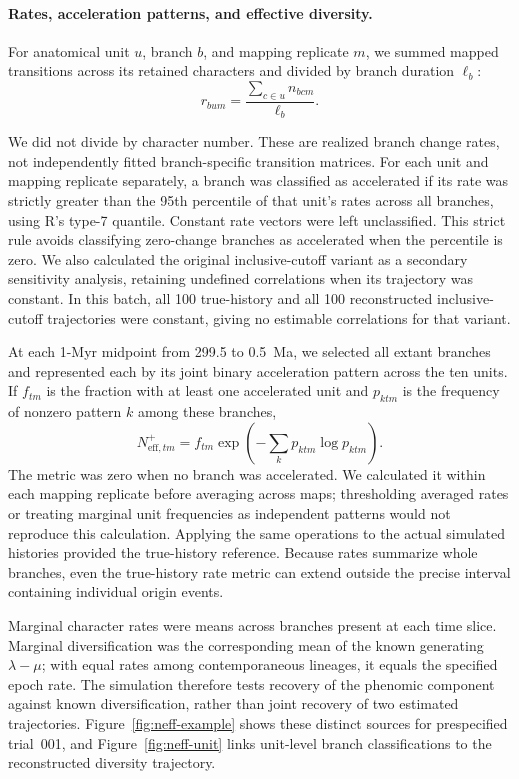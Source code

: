 \begin{samepage}
\paragraph{Rates, acceleration patterns, and effective diversity.}
For anatomical unit $u$, branch $b$, and mapping replicate $m$, we summed
mapped transitions across its retained characters and divided by branch
duration $\ell_b$:
\[
  r_{bum}=\frac{\sum_{c\in u}n_{bcm}}{\ell_b}.
\]
\end{samepage}
We did not divide by character number. These are realized branch change
rates, not independently fitted branch-specific transition matrices.
For each unit and mapping replicate separately, a branch was classified as
accelerated if its rate was strictly greater than the 95th percentile of
that unit's rates across all branches, using R's type-7 quantile.
Constant rate vectors were left unclassified. This strict rule avoids
classifying zero-change branches as accelerated when the percentile is zero.
We also calculated the original inclusive-cutoff variant as a secondary
sensitivity analysis, retaining undefined correlations when its trajectory
was constant. In this batch, all 100 true-history and all 100 reconstructed
inclusive-cutoff trajectories were constant, giving no estimable
correlations for that variant.

At each 1-Myr midpoint from 299.5 to 0.5~Ma, we selected all extant branches
and represented each by its joint binary acceleration pattern across the
ten units. If $f_{tm}$ is the fraction with at least one accelerated unit and
$p_{ktm}$ is the frequency of nonzero pattern $k$ among these branches,
\[
  N_{\mathrm{eff},tm}^{+}
  = f_{tm}\exp\left(-\sum_k p_{ktm}\log p_{ktm}\right).
\]
The metric was zero when no branch was accelerated. We calculated it within
each mapping replicate before averaging across maps; thresholding averaged
rates or treating marginal unit frequencies as independent patterns would
not reproduce this calculation. Applying the same operations to the actual
simulated histories provided the true-history reference.
Because rates summarize whole branches, even the true-history rate metric
can extend outside the precise interval containing individual origin events.

Marginal character rates were means across branches present at each time
slice. Marginal diversification was the corresponding mean of the known
generating $\lambda-\mu$; with equal rates among contemporaneous lineages,
it equals the specified epoch rate. The simulation therefore tests recovery
of the phenomic component against known diversification, rather than joint
recovery of two estimated trajectories. Figure~\ref{fig:neff-example} shows
these distinct sources for prespecified trial~001, and
Figure~\ref{fig:neff-unit} links unit-level branch classifications to the
reconstructed diversity trajectory.

